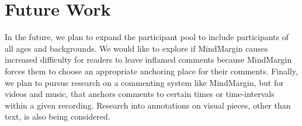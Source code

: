 \section{Future Work}
In the future, we plan to expand the participant pool to include participants of all ages and backgrounds. We would like to explore if MindMargin causes increased difficulty for readers to leave inflamed comments because MindMargin forces them to choose an appropriate anchoring place for their comments. Finally, we plan to pursue research on a commenting system like MindMargin, but for videos and music, that anchors comments to certain times or time-intervals within a given recording. Research into annotations on visual pieces, other than text, is also being considered.
